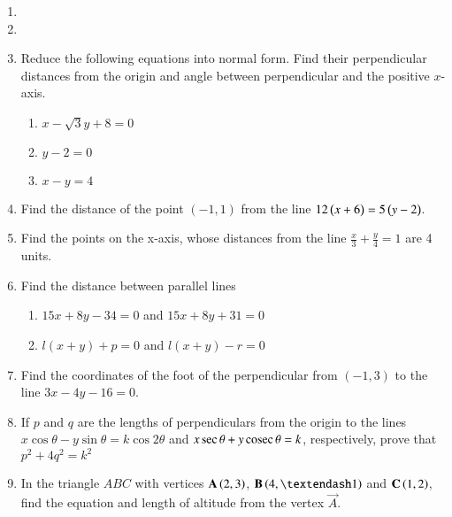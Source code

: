 \begin{enumerate}[label=\thesection.\arabic*,ref=\thesection.\theenumi]

\item 
\item 
\item  Reduce the following equations into normal form. Find their perpendicular distances from the origin and angle between perpendicular and the positive $x$-axis.
\label{chapters/11/10/3/3}
\begin{enumerate}
	\item $x-\sqrt{3}y+8=0$ 
	\item $y-2=0$
	\item $x-y=4$
\end{enumerate}
\solution

\item Find the distance of the point $(-1,1)$ from the line $12\left(x+6\right) = 5\left(y-2\right)$. 
\label{chapters/11/10/3/4}

\item Find the points on the x-axis, whose distances from the line $\frac{x}{3}+\frac{y}{4}=1$ are 4 units.
\label{chapters/11/10/3/5}
	\\
	\solution

\item Find the distance between parallel lines
\label{chapters/11/10/3/6}
\begin{enumerate}
	\item $15x+8y-34=0$ and  $15x+8y+31=0$ \\
	\item  $l(x+y)+p=0$ and  $l(x+y)-r=0$
\end{enumerate}
	\solution

\item Find the coordinates of the foot of the perpendicular from $(-1, 3)$ to the line $3x-4y-16=0$.  
\label{chapters/11/10/3/14}
\\
\solution

\item  If ${p}$ and ${q}$ are the lengths of perpendiculars from the origin to the lines ${x}\cos\theta - {y}\sin\theta =  {k}\cos2\theta$ and ${x}\sec\theta + {y}\,\text{cosec}\,\theta = {k}$, respectively, prove that ${p}^2 + 4{q}^2 = {k}^2$
\label{chapters/11/10/3/16}
\\
\solution

\item In the triangle $ABC$ with vertices $\mathbf{A} \left(2, 3\right)$, $\vec{B} \brak{4, –1}$ and $\mathbf{C} \left(1, 2\right)$, find the equation and length of altitude from the vertex $\vec{A}$.

\end{enumerate}
